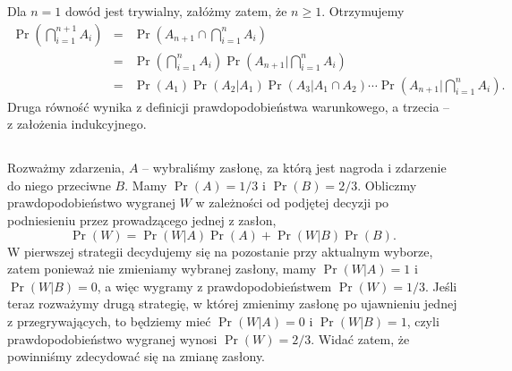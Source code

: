 Dla $n=1$ dowód jest trywialny, załóżmy zatem, że $n\ge 1$. Otrzymujemy
\begin{eqnarray*}
	\Pr\left(\bigcap_{i=1}^{n+1}A_i\right) &=& \Pr\left(A_{n+1}\cap\bigcap_{i=1}^nA_i\right) \\
	&=& \Pr\left(\bigcap_{i=1}^nA_i\right)\Pr\left(A_{n+1}\bigg|\bigcap_{i=1}^nA_i\right) \\
	&=& \Pr(A_1)\Pr\left(A_2|A_1\right)\Pr\left(A_3|A_1\cap A_2\right)\cdots\Pr\left(A_{n+1}\bigg|\bigcap_{i=1}^nA_i\right).
\end{eqnarray*}
Druga równość wynika z definicji prawdopodobieństwa warunkowego, a trzecia -- z założenia indukcyjnego.

\subsection{} %
\subsection{} %
\subsection{} %
Rozważmy zdarzenia, $A$ -- wybraliśmy zasłonę, za którą jest nagroda i zdarzenie do niego przeciwne $B$. Mamy $\Pr(A)=1/3$ i $\Pr(B)=2/3$. Obliczmy prawdopodobieństwo wygranej $W$ w zależności od podjętej decyzji po podniesieniu przez prowadzącego jednej z zasłon,
\[
	\Pr(W) = \Pr(W|A)\Pr(A)+\Pr(W|B)\Pr(B).
\]
W pierwszej strategii decydujemy się na pozostanie przy aktualnym wyborze, zatem ponieważ nie zmieniamy wybranej zasłony, mamy $\Pr(W|A)=1$ i~$\Pr(W|B)=0$, a więc wygramy z prawdopodobieństwem $\Pr(W)=1/3$. Jeśli teraz rozważymy drugą strategię, w której zmienimy zasłonę po ujawnieniu jednej z przegrywających, to będziemy mieć $\Pr(W|A)=0$ i $\Pr(W|B)=1$, czyli prawdopodobieństwo wygranej wynosi $\Pr(W)=2/3$. Widać zatem, że powinniśmy zdecydować się na zmianę zasłony.

